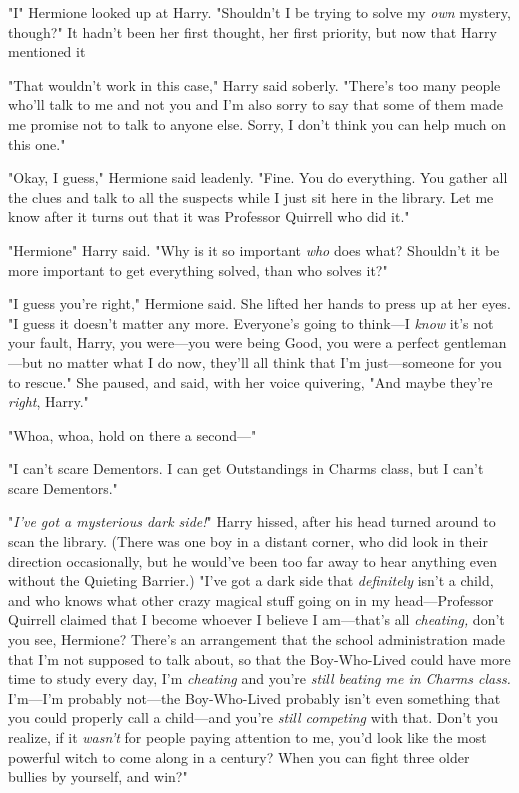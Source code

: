 "I{\el}" Hermione looked up at Harry. "Shouldn't I{\el} be trying to
solve my \emph{own} mystery, though?" It hadn't been her first thought, her
first priority, but now that Harry mentioned it{\el}

"That wouldn't work in this case," Harry said soberly. "There's too many people
who'll talk to me and not you{\el} and I'm also sorry to say that some of
them made me promise not to talk to anyone else. Sorry, I don't think you can
help much on this one."

"Okay, I guess," Hermione said leadenly. "Fine. You do everything. You gather
all the clues and talk to all the suspects while I just sit here in the
library. Let me know after it turns out that it was Professor Quirrell who did
it."

"Hermione{\el}" Harry said. "Why is it so important \emph{who} does what?
Shouldn't it be more important to get everything solved, than who solves it?"

"I guess you're right," Hermione said. She lifted her hands to press up at her
eyes. "I guess it doesn't matter any more. Everyone's going to think---I
\emph{know} it's not your fault, Harry, you were---you were being Good, you
were a perfect gentleman---but no matter what I do now, they'll all think that
I'm just---someone for you to rescue." She paused, and said, with her voice
quivering, "And maybe they're \emph{right}, Harry."

"Whoa, whoa, hold on there a second\mbox{---}"

"I can't scare Dementors. I can get Outstandings in Charms class, but I can't
scare Dementors."

"\emph{I've got a mysterious dark side!}" Harry hissed, after his head turned
around to scan the library. (There was one boy in a distant corner, who did
look in their direction occasionally, but he would've been too far away to hear
anything even without the Quieting Barrier.) "I've got a dark side that
\emph{definitely} isn't a child, and who knows what other crazy magical stuff
going on in my head---Professor Quirrell claimed that I become whoever I
believe I am---that's all \emph{cheating,} don't you see, Hermione? There's an
arrangement that the school administration made that I'm not supposed to talk
about, so that the Boy-Who-Lived could have more time to study every day, I'm
\emph{cheating} and you're \emph{still beating me in Charms class.} I'm---I'm
probably not---the Boy-Who-Lived probably isn't even something that you could
properly call a child---and you're \emph{still competing} with that. Don't you
realize, if it \emph{wasn't} for people paying attention to me, you'd look like
the most powerful witch to come along in a century? When you can fight three
older bullies by yourself, and win?"

